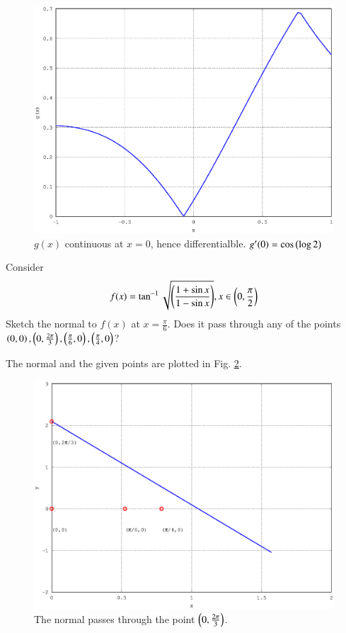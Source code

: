 \documentclass[journal,12pt,twocolumn]{IEEEtran}
\begin{document}
\solution


%
\begin{figure}[h]
\centering
\includegraphics[width=\columnwidth]{./version_2/ee16b1030/ee16b1030}
\caption{ $g(x)$ continuous at $x = 0$, hence differentialble.  $g^{\prime}(0) = \cos \left(\log 2\right)$}
\label{fig_30}	
\end{figure}
%
\begin{problem}
Consider 
\begin{equation*}
f(x) = \tan^{-1}\sqrt{\left(\frac{1+\sin x }{1-\sin x}\right)}, x \in \left(0,\frac{\pi}{2}\right)
\end{equation*}
Sketch the normal to $f(x)$ at $x = \frac{\pi}{6}$. Does it pass through any of the points $\left(0,0\right),\left(0,\frac{2\pi}{3}\right),\left(\frac{\pi}{6},0\right),\left(\frac{\pi}{4},0\right)$?
\end{problem}

The normal and the given points are plotted in Fig. \ref{fig_31}.

%
\begin{figure}[h]
\centering
\includegraphics[width=\columnwidth]{./version_2/ee16b1031/ee16b1031}
\caption{ The normal passes through the point $\left(0,\frac{2\pi}{3}\right)$.}
\label{fig_31}	
\end{figure}
\end{document}
